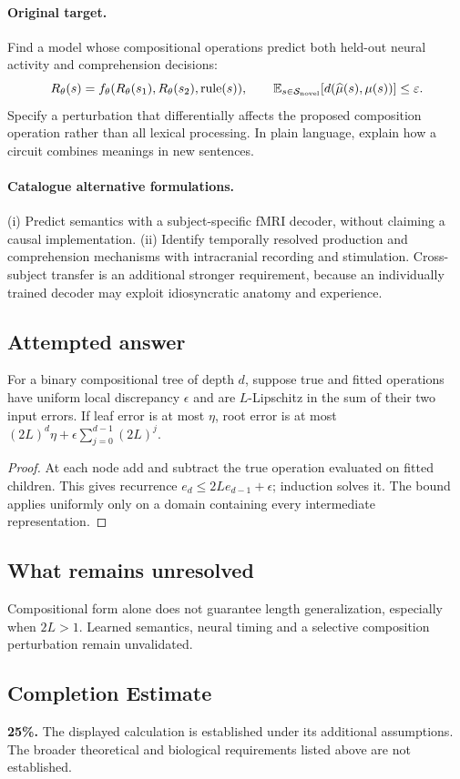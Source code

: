 \documentclass[11pt]{article}
\begin{document}
\paragraph{Original target.}
Find a model whose compositional operations predict both held-out neural activity and comprehension decisions:
\[
R_\theta(s)=f_\theta(R_\theta(s_1),R_\theta(s_2),\operatorname{rule}(s)),
\qquad
\mathbb{E}_{s\in\mathcal S_{\rm novel}}[d(\widehat\mu(s),\mu(s))]\leq\varepsilon.
\]
Specify a perturbation that differentially affects the proposed composition operation rather than all lexical processing. In plain language, explain how a circuit combines meanings in new sentences.
\paragraph{Catalogue alternative formulations.}
(i) Predict semantics with a subject-specific fMRI decoder, without claiming a causal implementation. (ii) Identify temporally resolved production and comprehension mechanisms with intracranial recording and stimulation. Cross-subject transfer is an additional stronger requirement, because an individually trained decoder may exploit idiosyncratic anatomy and experience.
\subsection{Attempted answer}
\begin{proposition}
For a binary compositional tree of depth $d$, suppose true and fitted operations have uniform local discrepancy $\epsilon$ and are $L$-Lipschitz in the sum of their two input errors. If leaf error is at most $\eta$, root error is at most $(2L)^d\eta+\epsilon\sum_{j=0}^{d-1}(2L)^j$.
\end{proposition}
\begin{proof}
At each node add and subtract the true operation evaluated on fitted children. This gives recurrence $e_d\leq2Le_{d-1}+\epsilon$; induction solves it. The bound applies uniformly only on a domain containing every intermediate representation.
\end{proof}
\subsection{What remains unresolved}
Compositional form alone does not guarantee length generalization, especially when $2L>1$. Learned semantics, neural timing and a selective composition perturbation remain unvalidated.
\subsection{Completion Estimate}
\textbf{25\%.} The displayed calculation is established under its additional assumptions. The broader theoretical and biological requirements listed above are not established.
\end{document}
